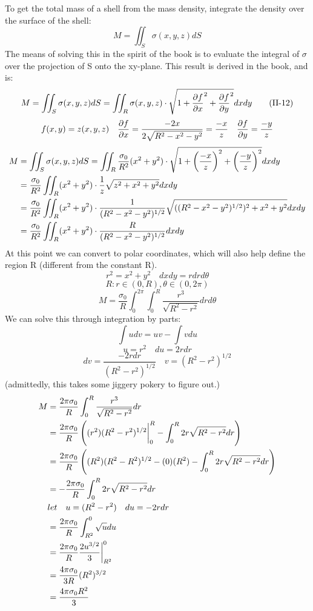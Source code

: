 \documentclass{article}
\begin{document}
\begin{enumerate}
    To get the total mass of a shell from the mass density, integrate the density over the surface
    of the shell:
    \[ M = \iint_S \sigma(x,y,z) dS \]
    The means of solving this in the spirit of the book is to evaluate the integral of $\sigma$ over the projection of S onto the xy-plane.
    This result is derived in the book, and is:
    \[ M = \iint_S \sigma(x,y,z) dS = \iint_R \sigma(x,y,z) \cdot \sqrt{1 + \frac{\partial{f}}{\partial{x}}^2 + \frac{\partial{f}}{\partial{y}}^2} dxdy \tag{II-12} \]
    \[ f(x,y) = z(x,y,z) \quad \frac{\partial{f}}{\partial{x}} = \frac{-2x}{2\sqrt{R^2 - x^2 - y^2}} = \frac{-x}{z} \quad \frac{\partial{f}}{\partial{y}} = {\frac{-y}{z}} \]
    \newcommand\px{\frac{-x}{z}}
    \newcommand\py{\frac{-y}{z}}
    \begin{align*}
        M &= \iint_S \sigma(x,y,z) dS = \iint_R \frac{\sigma_0}{R^2}(x^2 + y^2) \cdot \sqrt{1 + \left( \px \right)^2 + \left( \py \right)^2} dxdy \\
        &= \frac{\sigma_0}{R^2} \iint_R (x^2 + y^2) \cdot \frac{1}{z} \sqrt{z^2 + x^2 + y^2} dxdy \\
        &= \frac{\sigma_0}{R^2} \iint_R (x^2 + y^2) \cdot \frac{1}{\z} \sqrt{({\z})^2 + x^2 + y^2} dxdy \\
        &= \frac{\sigma_0}{R^2} \iint_R (x^2 + y^2) \cdot \frac{R}{\z} dxdy \\
    \end{align*}
    At this point we can convert to polar coordinates, which will also help define the region R
    (different from the constant R).
    \[ r^2 = x^2 + y^2 \quad dxdy = rdrd\theta \]
    \[ R: r \in (0,R), \theta \in (0,2\pi) \]
    \[ M = \frac{\sigma_0}{R} \int_0^{2\pi}\int_0^R \frac{r^3}{\sqrt{R^2 - r^2}} drd\theta \]
    We can solve this through integration by parts:
    \[ \int udv = uv - \int vdu \]
    \[ u = r^2 \quad du = 2rdr \]
    \[ dv = \frac{-2rdr}{(R^2 - r^2)^{1/2}} \quad v = (R^2 - r^2)^{1/2}\]
    (admittedly, this takes some jiggery pokery to figure out.)
    \begin{align*}
        M &= \frac{2\pi\sigma_0}{R} \int_0^R \frac{r^3}{\sqrt{R^2 - r^2}} dr \\
        &= \frac{2\pi\sigma_0}{R} \left( (r^2)(R^2 - r^2)^{1/2} \bigg{|}_0^R - \int_0^R 2r{\sqrt{R^2 - r^2}} dr \right) \\
        &= \frac{2\pi\sigma_0}{R} \left( (R^2)(R^2 - R^2)^{1/2} -(0)(R^2) - \int_0^R 2r{\sqrt{R^2 - r^2}} dr \right) \\
        &= -\frac{2\pi\sigma_0}{R} \int_0^R 2r{\sqrt{R^2 - r^2}} dr \\
        & let \quad u = (R^2 - r^2) \quad du = -2rdr \\
        &= \frac{2\pi\sigma_0}{R} \int_{R^2}^0 {\sqrt{u}} du \\
        &= \frac{2\pi\sigma_0}{R} \frac{2u^{3/2}}{3} \bigg{|}_{R^2}^{0} \\
        &= \frac{4\pi\sigma_0}{3R} (R^2)^{3/2} \\
        &= \frac{4\pi\sigma_0R^2}{3} \\
    \end{align*}


\end{enumerate}
\end{document}
